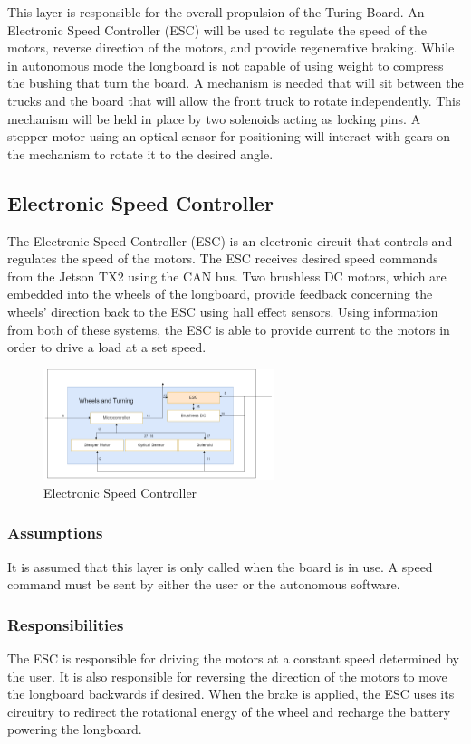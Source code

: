 This layer is responsible for the overall propulsion of the Turing Board. An Electronic Speed Controller (ESC) will be used to regulate the speed of the motors, reverse direction of the motors, and provide regenerative braking. While in autonomous mode the longboard is not capable of using weight to compress the bushing that turn the board. A mechanism is needed that will sit between the trucks and the board that will allow the front truck to rotate independently. This mechanism will be held in place by two solenoids acting as locking pins. A stepper motor using an optical sensor for positioning will interact with gears on the mechanism to rotate it to the desired angle.

\subsection{Electronic Speed Controller}
The Electronic Speed Controller (ESC) is an electronic circuit that controls and regulates the speed of the motors. The ESC receives desired speed commands from the Jetson TX2 using the CAN bus. Two brushless DC motors, which are embedded into the wheels of the longboard, provide feedback concerning the wheels' direction back to the ESC using hall effect sensors. Using information from both of these systems, the ESC is able to provide current to the motors in order to drive a load at a set speed.

\begin{figure}[h!]
	\centering
 	\includegraphics[width=0.60\textwidth]{ADS Latex/images/Keaton/ESC.png}
 \caption{Electronic Speed Controller}
\end{figure}

\subsubsection{Assumptions}
It is assumed that this layer is only called when the board is in use. A speed command must be sent by either the user or the autonomous software.

\subsubsection{Responsibilities}
The ESC is responsible for driving the motors at a constant speed determined by the user. It is also responsible for reversing the direction of the motors to move the longboard backwards if desired. When the brake is applied, the ESC uses its circuitry to redirect the rotational energy of the wheel and recharge the battery powering the longboard.

